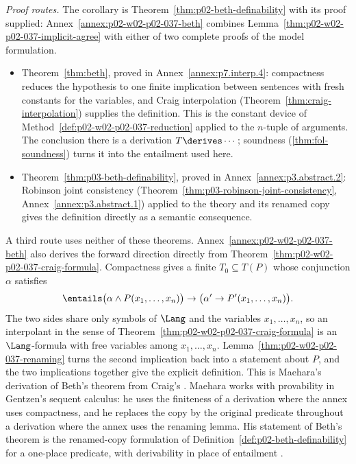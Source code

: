 \emph{Proof routes.}  The corollary is
Theorem~\ref{thm:p02-beth-definability} with its proof supplied:
Annex~\ref{annex:p02-w02-p02-037-beth} combines
Lemma~\ref{thm:p02-w02-p02-037-implicit-agree} with either of two complete
proofs of the model formulation.
\begin{itemize}
 \item Theorem~\ref{thm:beth}, proved in Annex~\ref{annex:p7.interp.4}:
       compactness reduces the hypothesis to one finite implication between
       sentences with fresh constants for the variables, and Craig
       interpolation (Theorem~\ref{thm:craig-interpolation}) supplies the
       definition.  This is the constant device of
       Method~\ref{def:p02-w02-p02-037-reduction} applied to the
       \(n\)-tuple of arguments.  The conclusion there is a derivation
       \(T\derives\cdots\); soundness (\cref{thm:fol-soundness}) turns it
       into the entailment used here.
 \item Theorem~\ref{thm:p03-beth-definability}, proved in
       Annex~\ref{annex:p3.abstract.2}: Robinson joint consistency
       (Theorem~\ref{thm:p03-robinson-joint-consistency},
       Annex~\ref{annex:p3.abstract.1}) applied to the theory and its
       renamed copy gives the definition directly as a semantic
       consequence.
\end{itemize}
A third route uses neither of these theorems.
Annex~\ref{annex:p02-w02-p02-037-beth} also derives the forward direction
directly from Theorem~\ref{thm:p02-w02-p02-037-craig-formula}.  Compactness
gives a finite \(T_0\subseteq T(P)\) whose conjunction \(\alpha\) satisfies
\[
 \entails\bigl(\alpha\land P(x_1,\ldots,x_n)\bigr)\to
 \bigl(\alpha'\to P'(x_1,\ldots,x_n)\bigr).
\]
The two sides share only symbols of \(\Lang\) and the variables
\(x_1,\ldots,x_n\), so an interpolant in the sense of
Theorem~\ref{thm:p02-w02-p02-037-craig-formula} is an \(\Lang\)-formula
with free variables among \(x_1,\ldots,x_n\).
Lemma~\ref{thm:p02-w02-p02-037-renaming} turns the second implication back
into a statement about \(P\), and the two implications together give the
explicit definition.  This is Maehara's derivation of Beth's theorem from
Craig's \cite[\S4, p.~236]{Maehara1960}.  Maehara works with provability in
Gentzen's sequent calculus: he uses the finiteness of a derivation where the
annex uses compactness, and he replaces the copy by the original predicate
throughout a derivation where the annex uses the renaming lemma.  His
statement of Beth's theorem is the renamed-copy formulation of
Definition~\ref{def:p02-beth-definability} for a one-place predicate, with
derivability in place of entailment \cite[\S2, p.~236]{Maehara1960}.

